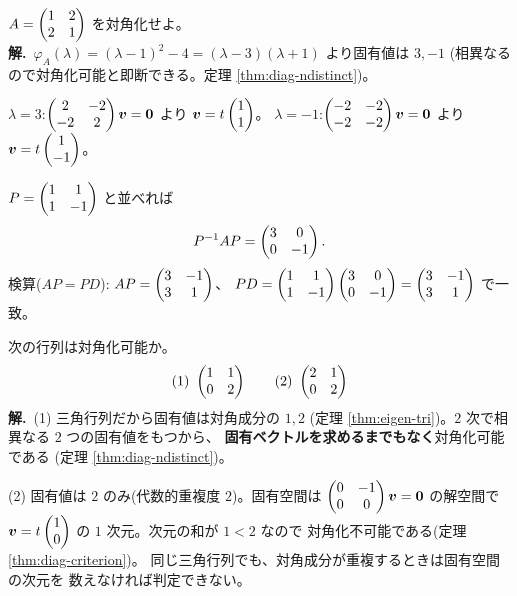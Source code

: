 \begin{rei}[例題・基本(対角化の実行)]\label{rei:diag-basic}
$A = \begin{pmatrix}1 & 2 \\ 2 & 1\end{pmatrix}$ を対角化せよ。\\
\textbf{解.}\ $\varphi_A(\lambda) = (\lambda - 1)^2 - 4
= (\lambda - 3)(\lambda + 1)$ より固有値は $3, -1$
(相異なるので対角化可能と即断できる。定理 \ref{thm:diag-ndistinct})。

$\lambda = 3$:$\begin{pmatrix}2 & -2 \\ -2 & 2\end{pmatrix}\bm{v} = \bm{0}$ より
$\bm{v} = t\begin{pmatrix}1 \\ 1\end{pmatrix}$。
$\lambda = -1$:$\begin{pmatrix}-2 & -2 \\ -2 & -2\end{pmatrix}\bm{v} = \bm{0}$ より
$\bm{v} = t\begin{pmatrix}1 \\ -1\end{pmatrix}$。

$P = \begin{pmatrix}1 & 1 \\ 1 & -1\end{pmatrix}$ と並べれば
\[
P^{-1}AP = \begin{pmatrix}3 & 0 \\ 0 & -1\end{pmatrix}.
\]
検算($AP = PD$):
$AP = \begin{pmatrix}3 & -1 \\ 3 & 1\end{pmatrix}$、
$PD = \begin{pmatrix}1 & 1 \\ 1 & -1\end{pmatrix}\begin{pmatrix}3 & 0 \\ 0 & -1\end{pmatrix} = \begin{pmatrix}3 & -1 \\ 3 & 1\end{pmatrix}$
で一致。
\end{rei}

\begin{rei}[例題・基本(対角化可能性の判定)]\label{rei:diag-judge}
次の行列は対角化可能か。
\[
(1)\ \begin{pmatrix}1 & 1 \\ 0 & 2\end{pmatrix} \qquad (2)\ \begin{pmatrix}2 & 1 \\ 0 & 2\end{pmatrix}
\]
\textbf{解.}\ (1) 三角行列だから固有値は対角成分の $1, 2$
(定理 \ref{thm:eigen-tri})。$2$ 次で相異なる $2$ つの固有値をもつから、
\textbf{固有ベクトルを求めるまでもなく}対角化可能である
(定理 \ref{thm:diag-ndistinct})。

(2) 固有値は $2$ のみ(代数的重複度 $2$)。固有空間は
$\begin{pmatrix}0 & -1 \\ 0 & 0\end{pmatrix}\bm{v} = \bm{0}$ の解空間で
$\bm{v} = t\begin{pmatrix}1 \\ 0\end{pmatrix}$ の $1$ 次元。次元の和が $1 < 2$ なので
対角化不可能である(定理 \ref{thm:diag-criterion})。
同じ三角行列でも、対角成分が重複するときは固有空間の次元を
数えなければ判定できない。
\end{rei}

